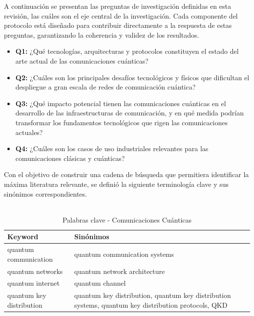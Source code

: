 A continuación se presentan las preguntas de investigación definidas en esta revisión, las cuáles son el eje central de la investigación. Cada componente del protocolo está diseñado para contribuir directamente a la respuesta de estas preguntas, garantizando la coherencia y validez de los resultados.

\begin{itemize}
    \item \textbf{Q1:} ¿Qué tecnologías, arquitecturas y protocolos constituyen el estado del arte actual de las comunicaciones cuánticas?
    \item \textbf{Q2:} ¿Cuáles son los principales desafíos tecnológicos y físicos que dificultan el despliegue a gran escala de redes de comunicación cuántica?
    \item \textbf{Q3:} ¿Qué impacto potencial tienen las comunicaciones cuánticas en el desarrollo de las infraestructuras de comunicación, y en qué medida podrían transformar los fundamentos tecnológicos que rigen las comunicaciones actuales?
    \item \textbf{Q4:} ¿Cuáles son los casos de uso industriales relevantes para las comunicaciones clásicas y cuánticas?
\end{itemize}

Con el objetivo de construir una cadena de búsqueda que permitiera identificar la máxima literatura relevante, se definió la siguiente terminología clave y sus sinónimos correspondientes.

\begin{table}[H]
\centering
\caption[Palabras clave - Comunicaciones Cuánticas]{
    \vspace{4pt}
    \fontsize{12}{11}\selectfont \\
    Palabras clave - Comunicaciones Cuánticas \\[2pt] %
}
\label{tab:keywords_comunicaciones_cuanticas} %
\begin{tabular}{@{} l p{6cm} @{}} %
\hline\hline
\textbf{Keyword} & \textbf{Sinónimos} \\
\hline
quantum communication & quantum communication systems \\
\hline
quantum networks & quantum network architecture \\
\hline
quantum internet & quantum channel \\
\hline
quantum key distribution & quantum key distribution, quantum key distribution systems, quantum key distribution protocols, QKD \\
\hline\hline
\end{tabular}
\end{table}

